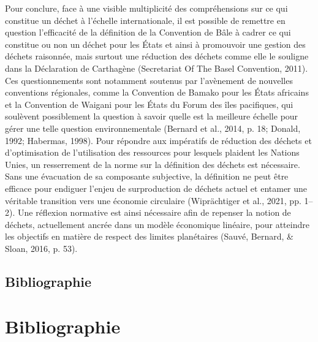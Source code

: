 \documentclass[12pt]{ulaval}
\begin{document}
Pour conclure, face à une visible multiplicité des compréhensions sur ce qui constitue un déchet à l'échelle internationale, il est possible de remettre en question l'efficacité de la définition de la Convention de Bâle à cadrer ce qui constitue ou non un déchet pour les États et ainsi à promouvoir une gestion des déchets raisonnée, mais surtout une réduction des déchets comme elle le souligne dans la Déclaration de Carthagène (Secretariat Of The Basel Convention, 2011). Ces questionnements sont notamment soutenus par l'avènement de nouvelles conventions régionales, comme la Convention de Bamako pour les États africains et la Convention de Waigani pour les États du Forum des îles pacifiques, qui soulèvent possiblement la question à savoir quelle est la meilleure échelle pour gérer une telle question environnementale (Bernard et al., 2014, p. 18; Donald, 1992; Habermas, 1998). Pour répondre aux impératifs de réduction des déchets et d'optimisation de l'utilisation des ressources pour lesquels plaident les Nations Unies, un resserrement de la norme sur la définition des déchets est nécessaire. Sans une évacuation de sa composante subjective, la définition ne peut être efficace pour endiguer l'enjeu de surproduction de déchets actuel et entamer une véritable transition vers une économie circulaire (Wiprächtiger et al., 2021, pp. 1--2). Une réflexion normative est ainsi nécessaire afin de repenser la notion de déchets, actuellement ancrée dans un modèle économique linéaire, pour atteindre les objectifs en matière de respect des limites planétaires (Sauvé, Bernard, \& Sloan, 2016, p. 53).

\section{Bibliographie}\label{bibliographie}

\backmatter

\chapter*{Bibliographie}\label{bibliographie-1}


\noindent

\setlength{\parindent}{-0.20in}
\setlength{\leftskip}{0.20in}
\setlength{\parskip}{8pt}
\end{document}
